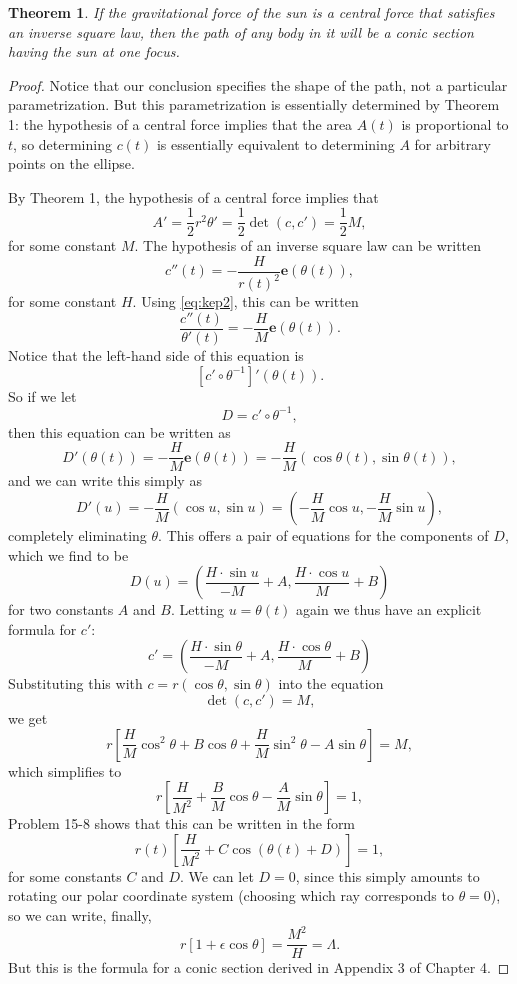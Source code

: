 \documentclass{article}
\numberwithin{corollary}{subsection}
\numberwithin{definition}{subsection}
\numberwithin{lemma}{subsection}
\newtheorem{theorem}{Theorem}
\numberwithin{theorem}{subsection}
\begin{document}
\begin{theorem}
  If the gravitational force of the sun is a central force that satisfies an
  inverse square law, then the path of any body in it will be a conic section
  having the sun at one focus.
\end{theorem}
\begin{proof}
  Notice that our conclusion specifies the shape of the path, not a particular
  parametrization. But this parametrization is essentially determined by
  Theorem 1: the hypothesis of a central force implies that the area $A(t)$ is
  proportional to $t$, so determining $c(t)$ is essentially equivalent to
  determining $A$ for arbitrary points on the ellipse.

  By Theorem 1, the hypothesis of a central force implies that
  \begin{equation} \tag{$K_2$}
    A' = \frac{1}{2}r^2\theta' = \frac{1}{2}\det(c, c') = \frac{1}{2}M,
  \end{equation}
  for some constant $M$. The hypothesis of an inverse square law can be written
  \begin{equation} \label{eq:planet-acc-1} \tag{*}
    c''(t) = -\frac{H}{r(t)^2}\mathbf{e}(\theta(t)),
  \end{equation}
  for some constant $H$. Using \eqref{eq:kep2}, this can be written \[
    \frac{c''(t)}{\theta'(t)} = -\frac{H}{M}\mathbf{e}(\theta(t)).
  \] Notice that the left-hand side of this equation is \[
    [c' \circ \theta^{-1}]'(\theta(t)).
  \] So if we let \[
    D = c' \circ \theta^{-1},
  \] then this equation can be written as \[
    D'(\theta(t)) = -\frac{H}{M}\mathbf{e}(\theta(t))
    = -\frac{H}{M}(\cos \theta(t), \sin \theta(t)),
  \] and we can write this simply as \[
    D'(u) = -\frac{H}{M}(\cos u, \sin u)
    = \left(-\frac{H}{M} \cos u, -\frac{H}{M} \sin u\right),
  \] completely eliminating $\theta$. This offers a pair of equations for the
  components of $D$, which we find to be \[
    D(u) = \left(
      \frac{H \cdot \sin u}{-M} + A,
      \frac{H \cdot \cos u}{M} + B
    \right)
  \] for two constants $A$ and $B$. Letting $u = \theta(t)$ again we thus have
  an explicit formula for $c'$: \[
    c' = \left(
      \frac{H \cdot \sin \theta}{-M} + A,
      \frac{H \cdot \cos \theta}{M} + B
    \right)
  \] Substituting this with $c = r(\cos \theta, \sin \theta)$ into the equation
  \begin{equation} \tag{$K_2$}
    \det(c, c') = M,
  \end{equation} we get \[
    r\left[
      \frac{H}{M} \cos^2 \theta + B \cos \theta
      + \frac{H}{M} \sin^2 \theta - A \sin \theta
    \right] = M,
  \] which simplifies to \[
    r\left[
      \frac{H}{M^2} + \frac{B}{M} \cos \theta - \frac{A}{M} \sin \theta
    \right] = 1,
  \] Problem 15-8 shows that this can be written in the form \[
    r(t)\left[\frac{H}{M^2} + C\cos(\theta(t) + D)\right] = 1,
  \] for some constants $C$ and $D$. We can let $D = 0$, since this simply
  amounts to rotating our polar coordinate system (choosing which ray
  corresponds to $\theta = 0$), so we can write, finally, \[
    r[1 + \epsilon \cos \theta] = \frac{M^2}{H} = \Lambda.
  \] But this is the formula for a conic section derived in Appendix 3 of
  Chapter 4.
\end{proof}
\end{document}
